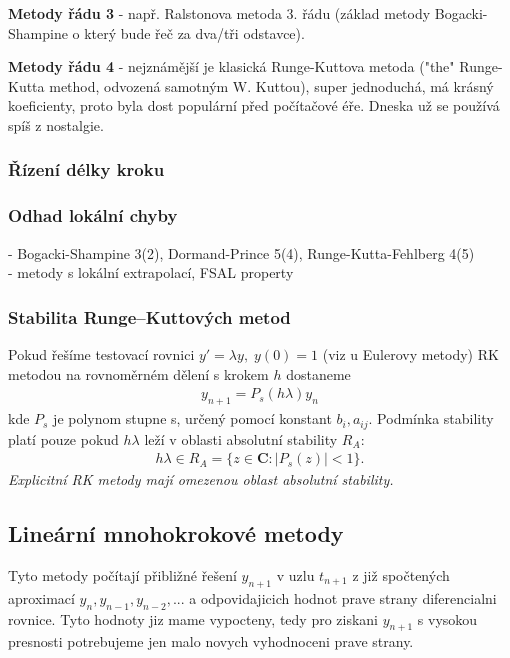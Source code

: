 \textbf{Metody řádu 3} - např. Ralstonova metoda 3. řádu (základ metody Bogacki-Shampine o který bude řeč za dva/tři odstavce).

\textbf{Metody řádu 4} - nejznámější je klasická Runge-Kuttova metoda ("the" Runge-Kutta method, odvozená samotným W. Kuttou), super jednoduchá, má krásný koeficienty, proto byla dost populární před počítačové éře. Dneska už se používá spíš z nostalgie. 

\subsubsection*{Řízení délky kroku}

\subsubsection*{Odhad lokální chyby}
- Bogacki-Shampine 3(2), Dormand-Prince 5(4), Runge-Kutta-Fehlberg 4(5) \\
- metody s lokální extrapolací, FSAL property

\subsubsection*{Stabilita Runge--Kuttových metod}
Pokud řešíme testovací rovnici $y'=\lambda y,\; y(0)=1$ (viz u Eulerovy metody) RK metodou na rovnoměrném dělení s krokem $h$ dostaneme
\begin{align}
y_{n+1}=P_{s}(h \lambda) y_{n}
\end{align}
kde $P_{s}$ je polynom stupne s, určený pomocí konstant $b_{i}, a_{ij}$. Podmínka stability platí pouze pokud $h \lambda$ leží v oblasti absolutní stability $R_{A}$:
\begin{align}
h \lambda \in R_{A} = \lbrace z \in \mathbf{C} : \vert P_{s}(z) \vert < 1 \rbrace.
\end{align}
\textit{Explicitní RK metody mají omezenou oblast absolutní stability.} 

\subsection{Lineární mnohokrokové metody}
Tyto metody počítají přibližné řešení $y_{n+1}$ v uzlu $t_{n+1}$ z již spočtených aproximací $y_{n}, y_{n-1}, y_{n-2},...$ a odpovidajicich hodnot prave strany diferencialni rovnice. Tyto hodnoty jiz mame vypocteny, tedy pro ziskani $y_{n+1}$ s vysokou presnosti potrebujeme  jen malo novych vyhodnoceni prave strany. 

